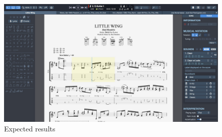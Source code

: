 \documentclass[10pt,twocolumn,letterpaper]{article}
\begin{document}
\begin{CJK}{UTF8}{bsmi}
\begin{figure}[t]
\begin{center}
   \includegraphics[width=0.8\linewidth]{gp75.jpg}
\end{center}
   \caption{Expected results}
\label{fig:long}
\label{fig:gp75}
\end{figure}

{\small


}

\end{CJK}
\end{document}
